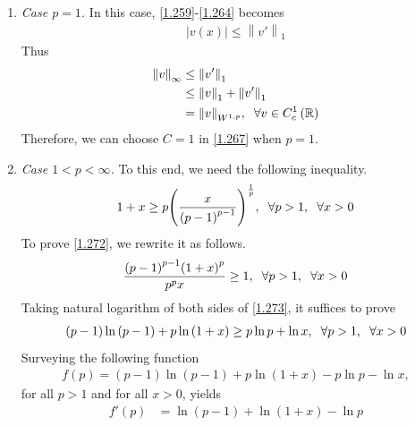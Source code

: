 \documentclass[a4paper,oneside]{article}
\numberwithin{equation}{section}
\begin{document}
\begin{enumerate}
\item \textit{Case $p=1$.} In this case, \eqref{1.259}-\eqref{1.264} becomes
\begin{align}
\left| {v\left( x \right)} \right| \le {\left\| {v'} \right\|_1}
\end{align}
Thus
\begin{align}
{\left\| v \right\|_\infty } &\le {\left\| {v'} \right\|_1}\\
& \le {\left\| v \right\|_1} + {\left\| {v'} \right\|_1}\\
& = {\left\| v \right\|_{{W^{1,p}}}},\hspace{0.2cm}\forall v \in C_c^1\left( \mathbb{R} \right)
\end{align}
Therefore, we can choose $C=1$ in \eqref{1.267} when $p=1$.
\item \textit{Case $1<p<\infty$.} To this end, we need the following inequality.
\begin{align}
\label{1.272}
1 + x \ge p{\left( {\frac{x}{{{{\left( {p - 1} \right)}^{p - 1}}}}} \right)^{\frac{1}{p}}},\hspace{0.2cm}\forall p > 1,\hspace{0.2cm}\forall x > 0
\end{align}
To prove \eqref{1.272}, we rewrite it as follows.
\begin{align}
\label{1.273}
\frac{{{{\left( {p - 1} \right)}^{p - 1}}{{\left( {1 + x} \right)}^p}}}{{{p^p}x}} \ge 1,\hspace{0.2cm}\forall p > 1,\hspace{0.2cm}\forall x > 0
\end{align}
Taking natural logarithm of both sides of \eqref{1.273}, it suffices to prove
\begin{align}
\left( {p - 1} \right)\ln \left( {p - 1} \right) + p\ln \left( {1 + x} \right) \ge p\ln p + \ln x,\hspace{0.2cm}\forall p > 1,\hspace{0.2cm}\forall x > 0
\end{align}
Surveying the following function
\begin{align}
f\left( p \right) = \left( {p - 1} \right)\ln \left( {p - 1} \right) + p\ln \left( {1 + x} \right) - p\ln p - \ln x ,
\end{align}
for all $p>1$ and for all $x>0$, yields
\begin{align}
f'\left( p \right) &= \ln \left( {p - 1} \right) + \ln \left( {1 + x} \right) - \ln p\\

\end{align}
\end{enumerate}
\end{document}
